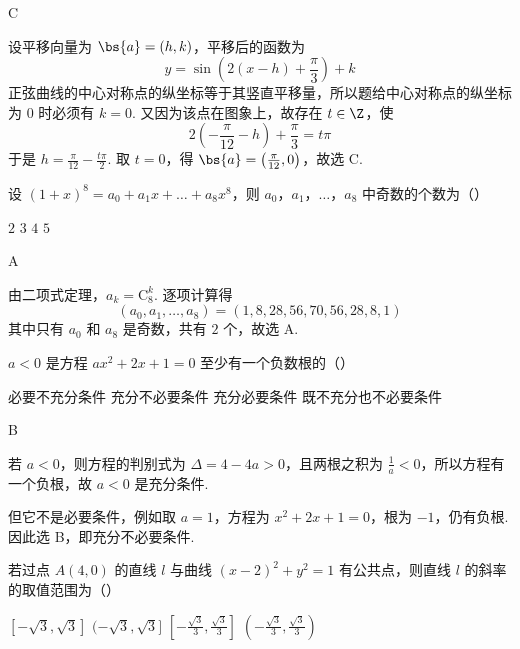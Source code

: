 \begin{answer}
C
\end{answer}

\begin{solution}
设平移向量为 \(\bs{a}=(h,k)\)，平移后的函数为
\[
y=\sin\left(2(x-h)+\frac{\pi}{3}\right)+k
\]
正弦曲线的中心对称点的纵坐标等于其竖直平移量，所以题给中心对称点的纵坐标为 \(0\) 时必须有 \(k=0\). 又因为该点在图象上，故存在 \(t\in\Z\)，使
\[
2\left(-\frac{\pi}{12}-h\right)+\frac{\pi}{3}=t\pi
\]
于是 \(h=\frac{\pi}{12}-\frac{t\pi}{2}\). 取 \(t=0\)，得 \(\bs{a}=\left(\frac{\pi}{12},0\right)\)，故选 C.
\end{solution}

\begin{problem}
设 \((1 + x)^{8} = a_{0} + a_{1}x + \dots +a_{8}x^{8}\)，则 \(a_0\)，\(a_1\)，\(\dots\)，\(a_8\) 中奇数的个数为（\quad）

\choices
    {\(2\)}
    {\(3\)}
    {\(4\)}
    {\(5\)}
\end{problem}

\begin{answer}
A
\end{answer}

\begin{solution}
由二项式定理，\(a_k=\mathrm{C}_8^k\). 逐项计算得
\[
(a_0,a_1,\ldots,a_8)=(1,8,28,56,70,56,28,8,1)
\]
其中只有 \(a_0\) 和 \(a_8\) 是奇数，共有 \(2\) 个，故选 A.
\end{solution}

\begin{problem}
\(a < 0\) 是方程 \(ax^2 + 2x + 1 = 0\) 至少有一个负数根的（\quad）

\choices
    {必要不充分条件}
    {充分不必要条件}
    {充分必要条件}
    {既不充分也不必要条件}
\end{problem}

\begin{answer}
B
\end{answer}

\begin{solution}
若 \(a<0\)，则方程的判别式为 \(\Delta=4-4a>0\)，且两根之积为 \(\frac{1}{a}<0\)，所以方程有一个负根，故 \(a<0\) 是充分条件.

但它不是必要条件，例如取 \(a=1\)，方程为 \(x^2+2x+1=0\)，根为 \(-1\)，仍有负根. 因此选 B，即充分不必要条件.
\end{solution}

\begin{problem}
若过点 \(A(4,0)\) 的直线 \(l\) 与曲线 \((x - 2)^2 + y^2 = 1\) 有公共点，则直线 \(l\) 的斜率的取值范围为（\quad）

\choices
    {\([- \sqrt{3}, \sqrt{3} ]\)}
    {\((- \sqrt{3}, \sqrt{3} ]\)}
    {\(\left[-\frac{\sqrt{3}}{3}, \frac{\sqrt{3}}{3}\right]\)}
    {\(\left(-\frac{\sqrt{3}}{3}, \frac{\sqrt{3}}{3}\right)\)}
\end{problem}

